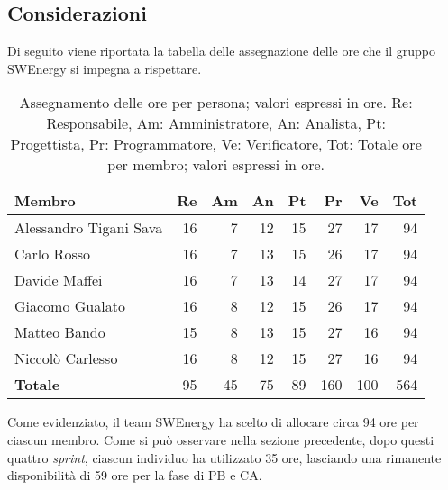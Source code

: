 \subsection{Considerazioni}
Di seguito viene riportata la tabella delle assegnazione delle ore che il gruppo SWEnergy si impegna a rispettare.

\begin{table}[H]
	\renewcommand{\arraystretch}{1.5}
	\centering
	\begin{tabular}{l|r|r|r|r|r|r|r}
		\textbf{Membro}        & \textbf{Re} & \textbf{Am} & \textbf{An}  & \textbf{Pt}
		                       & \textbf{Pr} & \textbf{Ve} & \textbf{Tot}                                 \\
		\hline
		Alessandro Tigani Sava & 16          & 7           & 12           & 15          & 27  & 17  & 94  \\
		Carlo Rosso            & 16          & 7           & 13           & 15          & 26  & 17  & 94  \\
		Davide Maffei          & 16          & 7           & 13           & 14          & 27  & 17  & 94  \\
		Giacomo Gualato        & 16          & 8           & 12           & 15          & 26  & 17  & 94  \\
		Matteo Bando           & 15          & 8           & 13           & 15          & 27  & 16  & 94  \\
		Niccolò Carlesso       & 16          & 8           & 12           & 15          & 27  & 16  & 94  \\
		\hline
		\textbf{Totale}        & 95          & 45          & 75           & 89          & 160 & 100 & 564 \\
	\end{tabular}

	\caption{Assegnamento delle ore per persona; valori espressi in ore.
		Re: Responsabile, Am: Amministratore, An: Analista, Pt:
		Progettista, Pr: Programmatore, Ve: Verificatore, Tot: Totale ore per
		membro; valori espressi in ore.}
\end{table}

Come evidenziato, il team SWEnergy ha scelto di allocare circa 94 ore per ciascun membro. Come si può osservare nella sezione precedente, dopo questi quattro \textit{sprint}, ciascun
individuo ha utilizzato 35 ore, lasciando una rimanente disponibilità di 59 ore per la fase di PB e CA.


